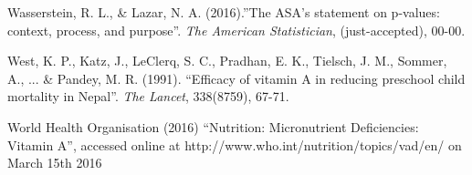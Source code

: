 \documentclass[12pt]{article}
\begin{document}
\begin{thebibliography}{99}
\bibitem Wasserstein, R. L., \& Lazar, N. A. (2016).''The ASA's statement on p-values: context, process, and purpose''. \emph{The American Statistician}, (just-accepted), 00-00.

\bibitem West, K. P., Katz, J., LeClerq, S. C., Pradhan, E. K., Tielsch, J. M., Sommer, A., ... \& Pandey, M. R. (1991). ``Efficacy of vitamin A in reducing preschool child mortality in Nepal''. \emph{The Lancet}, 338(8759), 67-71.

\bibitem World Health Organisation (2016) ``Nutrition: Micronutrient Deficiencies: Vitamin A'', accessed online at http://www.who.int/nutrition/topics/vad/en/ on March 15th 2016


\end{thebibliography}


\end{document}
